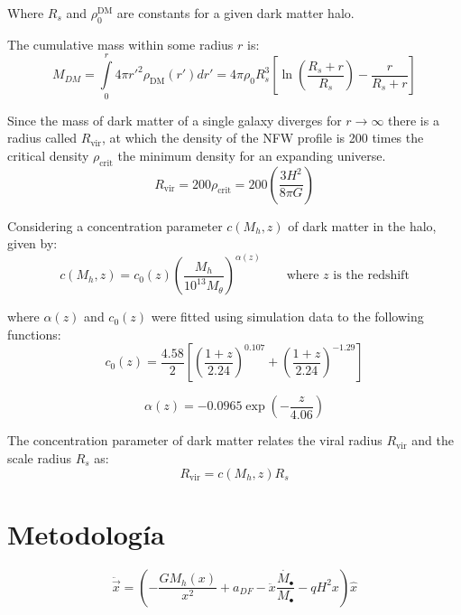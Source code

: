 		Where $R_s$ and $\rho_0^\text{DM}$ are constants for a given dark matter halo.
		
		The cumulative mass within some radius $r$ is:
		\begin{equation}
			M_{DM} = \int\limits_0^{r} 4\pi {r'}^2\rho_\text{DM}(r')dr' = 4\pi\rho_0R_s^3\left[\ln\left(\dfrac{R_s + r}{R_s}\right) - \dfrac{r}{R_s + r}\right]
		\end{equation}
		
		Since the mass of dark matter of a single galaxy diverges for $r \rightarrow \infty$ there is a radius called $R_\text{vir}$, at which the density of the NFW profile is 200 times the critical density $\rho_\text{crit}$ the minimum density for an expanding universe.
		\begin{equation}
			R_\text{vir} = 200 \rho_\text{crit} = 200 \left(\dfrac{3H^2}{8\pi G}\right)
		\end{equation}
		
		Considering a concentration parameter $c(M_h, z)$ of dark matter in the halo, given by:
		\begin{equation}
			c(M_h, z) = c_0(z)\left(\dfrac{M_h}{10^{13}M_\theta}\right)^{\alpha(z)} \qquad \text{where $z$ is the redshift}
		\end{equation}
		
		where $\alpha(z)$ and $c_0(z)$ were fitted using simulation data to the following functions:
		\begin{equation}
			c_0(z) = \dfrac{4.58}{2}\left[\left(\dfrac{1 + z}{2.24}\right)^{0.107} + \left(\dfrac{1 + z}{2.24}\right)^{-1.29}\right]
		\end{equation}
		
		\begin{equation}
			\alpha(z) = -0.0965 \exp\left(-\dfrac{z}{4.06}\right)
		\end{equation}
		
		The concentration parameter of dark matter relates the viral radius $R_\text{vir}$ and the scale radius $R_s$ as:
		\begin{equation}
		R_\text{vir} = c(M_h, z)R_s
		\end{equation}

	
\section{Metodología}
	\begin{equation}
		\ddot{\vec{x}} = \left(-\dfrac{GM_h(x)}{x^2} + a_{DF}-\ddot{x}\dfrac{\dot{M_\bullet}}{M_\bullet} -qH^2x\right)\hat{x}
	\end{equation}
	
